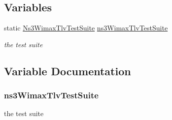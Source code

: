 \subsection*{Variables}
\begin{DoxyCompactItemize}
\item 
static \hyperlink{classNs3WimaxTlvTestSuite}{Ns3\+Wimax\+Tlv\+Test\+Suite} \hyperlink{wimax-tlv-test_8cc_aca8fab761031366688f8f887187acda6}{ns3\+Wimax\+Tlv\+Test\+Suite}
\begin{DoxyCompactList}\small\item\em the test suite \end{DoxyCompactList}\end{DoxyCompactItemize}


\subsection{Variable Documentation}
\subsubsection[{\texorpdfstring{ns3\+Wimax\+Tlv\+Test\+Suite}{ns3WimaxTlvTestSuite}}]{ ns3\+Wimax\+Tlv\+Test\+Suite\hspace{0.3cm}{\ttfamily [static]}}\hypertarget{wimax-tlv-test_8cc_aca8fab761031366688f8f887187acda6}{}\label{wimax-tlv-test_8cc_aca8fab761031366688f8f887187acda6}


the test suite 

